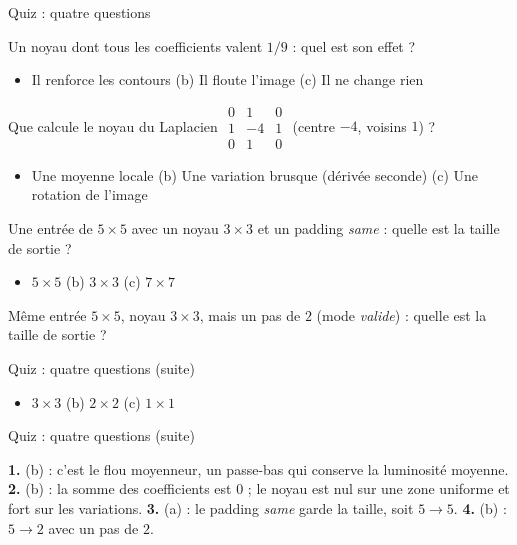 \begin{frame}{Quiz : quatre questions}
\begin{qbox}
Un noyau dont tous les coefficients valent $1/9$ : quel est son effet ?
\begin{itemize}
  \item[(a)] Il renforce les contours \quad (b) Il floute l'image
  \quad (c) Il ne change rien
\end{itemize}
\end{qbox}
\begin{qbox}
Que calcule le noyau du Laplacien
$\begin{smallmatrix}0&1&0\\1&-4&1\\0&1&0\end{smallmatrix}$
(centre $-4$, voisins $1$) ?
\begin{itemize}
  \item[(a)] Une moyenne locale \quad (b) Une variation brusque
  (dérivée seconde) \quad (c) Une rotation de l'image
\end{itemize}
\end{qbox}
\begin{qbox}
Une entrée de $5 \times 5$ avec un noyau $3 \times 3$ et un padding
\emph{same} : quelle est la taille de sortie ?
\begin{itemize}
  \item[(a)] $5 \times 5$ \quad (b) $3 \times 3$ \quad (c) $7 \times 7$
\end{itemize}
\end{qbox}
\begin{qbox}
Même entrée $5 \times 5$, noyau $3 \times 3$, mais un pas de $2$ (mode
\emph{valide}) : quelle est la taille de sortie ?

\end{qbox}

\end{frame}
\begin{frame}{Quiz : quatre questions (suite)}
\begin{itemize}
  \item[(a)] $3 \times 3$ \quad (b) $2 \times 2$ \quad (c) $1 \times 1$
\end{itemize}
\end{frame}
\begin{frame}{Quiz : quatre questions (suite)}
\begin{solbox}[Réponses]
\textbf{1.} (b) : c'est le flou moyenneur, un passe-bas qui conserve la
luminosité moyenne. \quad
\textbf{2.} (b) : la somme des coefficients est $0$ ; le noyau est nul sur
une zone uniforme et fort sur les variations. \quad
\textbf{3.} (a) : le padding \emph{same} garde la taille, soit $5 \to 5$. \quad
\textbf{4.} (b) : $5 \to 2$ avec un pas de $2$.
\end{solbox}
\end{frame}

